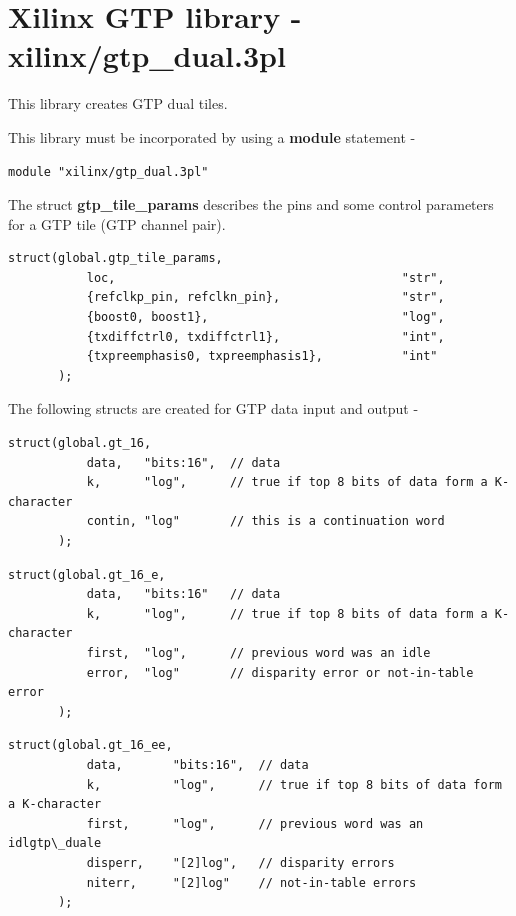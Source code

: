 \pagebreak

\section{Xilinx GTP library - xilinx/gtp\_dual.3pl}


    This library creates GTP dual tiles.
    
    This library must be incorporated by using a {\bf module}
    statement -
    \begin{lstlisting}[gobble=4, language=threepl]
       module "xilinx/gtp_dual.3pl"
    \end{lstlisting}
            
    The struct {\bf gtp\_tile\_params} describes the pins and some control
    parameters for a GTP tile (GTP channel pair).

    \begin{lstlisting}[gobble=4, language=threepl]
       struct(global.gtp_tile_params,
           loc,                                        "str",
           {refclkp_pin, refclkn_pin},                 "str",
           {boost0, boost1},                           "log",
           {txdiffctrl0, txdiffctrl1},                 "int",
           {txpreemphasis0, txpreemphasis1},           "int"
       );
    \end{lstlisting}

    The following structs are created for GTP data input and output -

    \begin{lstlisting}[gobble=4, language=threepl]
       struct(global.gt_16,
           data,   "bits:16",  // data
           k,      "log",      // true if top 8 bits of data form a K-character
           contin, "log"       // this is a continuation word
       );
    \end{lstlisting}

    \begin{lstlisting}[gobble=4, language=threepl]
       struct(global.gt_16_e,
           data,   "bits:16"   // data
           k,      "log",      // true if top 8 bits of data form a K-character
           first,  "log",      // previous word was an idle
           error,  "log"       // disparity error or not-in-table error
       );
    \end{lstlisting}

    \begin{lstlisting}[gobble=4, language=threepl]
       struct(global.gt_16_ee,
           data,       "bits:16",  // data
           k,          "log",      // true if top 8 bits of data form a K-character
           first,      "log",      // previous word was an idlgtp\_duale
           disperr,    "[2]log",   // disparity errors
           niterr,     "[2]log"    // not-in-table errors
       );
    \end{lstlisting}
    
